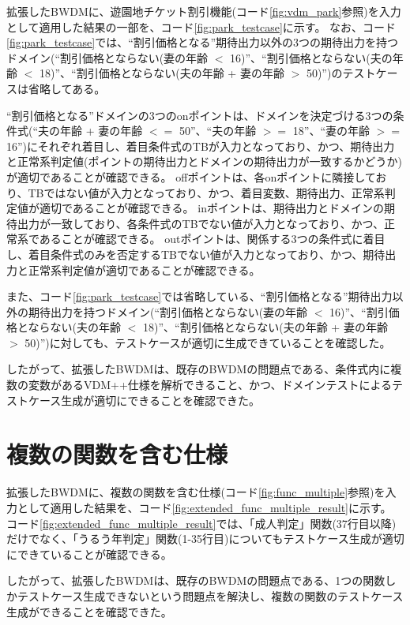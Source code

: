 \documentclass[uplatex, report, a4j, 10pt]{jsbook}
\begin{document}
拡張したBWDMに、遊園地チケット割引機能(コード\ref{fig:vdm_park}参照)を入力として適用した結果の一部を、コード\ref{fig:park_testcase}に示す。
なお、コード\ref{fig:park_testcase}では、“割引価格となる”期待出力以外の3つの期待出力を持つドメイン(“割引価格とならない(妻の年齢 $<$ 16)”、“割引価格とならない(夫の年齢 $<$ 18)”、“割引価格とならない(夫の年齢 + 妻の年齢 $>$ 50)”)のテストケースは省略してある。

“割引価格となる”ドメインの3つのonポイントは、ドメインを決定づける3つの条件式(“夫の年齢 + 妻の年齢 $<=$ 50”、“夫の年齢 $>=$ 18”、“妻の年齢 $>=$ 16”)にそれぞれ着目し、着目条件式のTBが入力となっており、かつ、期待出力と正常系判定値(ポイントの期待出力とドメインの期待出力が一致するかどうか)が適切であることが確認できる。
offポイントは、各onポイントに隣接しており、TBではない値が入力となっており、かつ、着目変数、期待出力、正常系判定値が適切であることが確認できる。
inポイントは、期待出力とドメインの期待出力が一致しており、各条件式のTBでない値が入力となっており、かつ、正常系であることが確認できる。
outポイントは、関係する3つの条件式に着目し、着目条件式のみを否定するTBでない値が入力となっており、かつ、期待出力と正常系判定値が適切であることが確認できる。

また、コード\ref{fig:park_testcase}では省略している、“割引価格となる”期待出力以外の期待出力を持つドメイン(“割引価格とならない(妻の年齢 $<$ 16)”、“割引価格とならない(夫の年齢 $<$ 18)”、“割引価格とならない(夫の年齢 + 妻の年齢 $>$ 50)”)に対しても、テストケースが適切に生成できていることを確認した。

したがって、拡張したBWDMは、既存のBWDMの問題点である、条件式内に複数の変数があるVDM++仕様を解析できること、かつ、ドメインテストによるテストケース生成が適切にできることを確認できた。


\section{複数の関数を含む仕様}\label{sec:tekiyou_multi_func}
拡張したBWDMに、複数の関数を含む仕様(コード\ref{fig:func_multiple}参照)を入力として適用した結果を、コード\ref{fig:extended_func_multiple_result}に示す。
コード\ref{fig:extended_func_multiple_result}では、「成人判定」関数(37行目以降)だけでなく、「うるう年判定」関数(1-35行目)についてもテストケース生成が適切にできていることが確認できる。

したがって、拡張したBWDMは、既存のBWDMの問題点である、1つの関数しかテストケース生成できないという問題点を解決し、複数の関数のテストケース生成ができることを確認できた。
\end{document}
